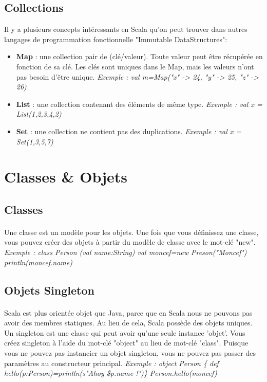 \subsection{Collections}
Il y a plusieurs concepts intéressants en Scala qu'on peut trouver dans autres langages de programmation fonctionnelle "Immutable DataStructures":
\begin{itemize}
\item \textbf{Map} : une collection pair de (clé/valeur). Toute valeur peut être récupérée en fonction de sa clé. Les clés sont uniques dans le Map, mais les valeurs n'ont pas besoin d'être unique.\newline
\textit{Exemple : val m=Map("x" -> 24, "y" -> 25, "z" -> 26)}
\item \textbf{List} : une collection contenant des éléments de même type. \newline
\textit{Exemple : val x = List(1,2,3,4,2)}
\item \textbf{Set } : une collection ne contient pas des duplications.\newline
\textit{Exemple : val x = Set(1,3,5,7)}
\end{itemize}
\section{Classes \& Objets}
\subsection{Classes}
\paragraph{}
Une classe est un modèle pour les objets. Une fois que vous définissez une classe, vous pouvez créer des objets à partir du modèle de classe avec le mot-clé "new".\newline
\textit{Exemple : class Person (val name:String)\newline 
val moncef=new Preson("Moncef")\newline
println(moncef.name)}
\subsection{Objets Singleton}
\paragraph{}
Scala est plus orientée objet que Java, parce que en Scala nous ne pouvons pas avoir des membres statiques. Au lieu de cela, Scala possède des objets uniques. Un singleton est une classe qui peut avoir qu'une seule instance 'objet'. Vous créez singleton à l'aide du mot-clé "object" au lieu de mot-clé "class". Puisque vous ne pouvez pas instancier un objet singleton, vous ne pouvez pas passer des paramètres au constructeur principal.
\textit{Exemple : object Person \{ def hello(p:Person)=println(s"Ahoy \$p.name !")\}\newline
Person.hello(moncef)}
